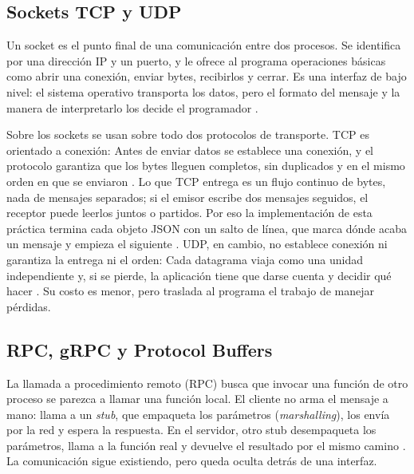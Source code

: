 \subsection{Sockets TCP y UDP}

Un socket es el punto final de una comunicación entre dos procesos. Se identifica por una dirección IP y un puerto, y le ofrece al programa operaciones básicas como abrir una conexión, enviar bytes, recibirlos y cerrar. Es una interfaz de bajo nivel: el sistema operativo transporta los datos, pero el formato del mensaje y la manera de interpretarlo los decide el programador \cite{vanSteenTanenbaum2023}.

Sobre los sockets se usan sobre todo dos protocolos de transporte. TCP es orientado a conexión: Antes de enviar datos se establece una conexión, y el protocolo garantiza que los bytes lleguen completos, sin duplicados y en el mismo orden en que se enviaron \cite{eddy2022tcp}. Lo que TCP entrega es un flujo continuo de bytes, nada de mensajes separados; si el emisor escribe dos mensajes seguidos, el receptor puede leerlos juntos o partidos. Por eso la implementación de esta práctica termina cada objeto JSON con un salto de línea, que marca dónde acaba un mensaje y empieza el siguiente \cite{bray2017json}. UDP, en cambio, no establece conexión ni garantiza la entrega ni el orden: 	Cada datagrama viaja como una unidad independiente y, si se pierde, la aplicación tiene que darse cuenta y decidir qué hacer \cite{vanSteenTanenbaum2023}. Su costo es menor, pero traslada al programa el trabajo de manejar pérdidas.

\subsection{RPC, gRPC y Protocol Buffers}

La llamada a procedimiento remoto (RPC) busca que invocar una función de otro proceso se parezca a llamar una función local. El cliente no arma el mensaje a mano: llama a un \emph{stub}, que empaqueta los parámetros (\emph{marshalling}), los envía por la red y espera la respuesta. En el servidor, otro stub desempaqueta los parámetros, llama a la función real y devuelve el resultado por el mismo camino \cite{vanSteenTanenbaum2023}. La comunicación sigue existiendo, pero queda oculta detrás de una interfaz.

